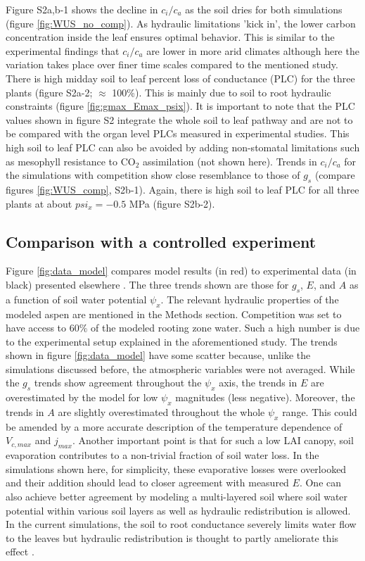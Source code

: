 \documentclass[utf8]{frontiersSCNS} %
\begin{document}
Figure S2a,b-1 shows the decline in $c_i / c_a$ as the soil dries for both simulations (figure \ref{fig:WUS_no_comp}). As hydraulic limitations 'kick in', the lower carbon concentration inside the leaf ensures optimal behavior. This is similar to the experimental findings that $c_i / c_a$ are lower in more arid climates \citep{prentice2014balancing} although here the variation takes place over finer time scales compared to the mentioned study. There is high midday soil to leaf percent loss of conductance (PLC) for the three plants (figure S2a-2; $\approx$ 100\%). This is mainly due to soil to root hydraulic constraints (figure \ref{fig:gmax_Emax_psix}). It is important to note that the PLC values shown in figure S2 integrate the whole soil to leaf pathway and are not to be compared with the organ level PLCs measured in experimental studies. This high soil to leaf PLC can also be avoided by adding non-stomatal limitations such as mesophyll resistance to CO$_2$ assimilation (not shown here). Trends in $c_i / c_a$ for the simulations with competition show close resemblance to those of $g_s$ (compare figures \ref{fig:WUS_comp}, S2b-1). Again, there is high soil to leaf PLC for all three plants at about $psi_x = -0.5$ MPa (figure S2b-2). 

\subsection{Comparison with a controlled experiment}

Figure \ref{fig:data_model} compares model results (in red) to experimental data (in black) presented elsewhere \citep{venturas_2018}. The three trends shown are those for $g_s$, $E$, and $A$ as a function of soil water potential $\psi_x$. The relevant hydraulic properties of the modeled aspen are mentioned in the Methods section. Competition was set to have access to $60\%$ of the modeled rooting zone water. Such a high number is due to the experimental setup explained in the aforementioned study. The trends shown in figure \ref{fig:data_model} have some scatter because, unlike the simulations discussed before, the atmospheric variables were not averaged. While the $g_s$ trends show agreement throughout the $\psi_x$ axis, the trends in $E$ are overestimated by the model for low $\psi_x$ magnitudes (less negative). Moreover, the trends in $A$ are slightly overestimated throughout the whole $\psi_x$ range. This could be amended by a more accurate description of the temperature dependence of $V_{c,max}$ and $j_{max}$. Another important point is that for such a low LAI canopy, soil evaporation contributes to a non-trivial fraction of soil water loss. In the simulations shown here, for simplicity, these evaporative losses were overlooked and their addition should lead to closer agreement with measured $E$. One can also achieve better agreement by modeling a multi-layered soil where soil water potential within various soil layers as well as hydraulic redistribution is allowed. In the current simulations, the soil to root conductance severely limits water flow to the leaves but hydraulic redistribution is thought to partly ameliorate this effect \citep{huang_2017}.
\end{document}
